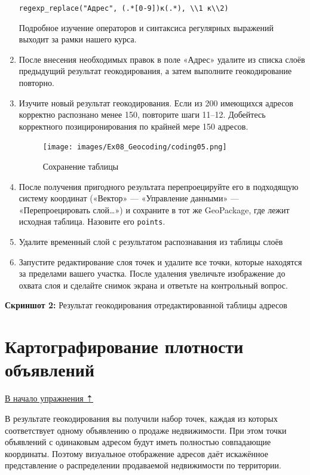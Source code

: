 \documentclass[
  12pt,
]{book}
\begin{document}
\begin{enumerate}
  \texttt{regexp\_replace("Адрес",\ \textquotesingle{}(.*{[}0-9{]})к(.*)\textquotesingle{},\ \textquotesingle{}\textbackslash{}\textbackslash{}1\ к\textbackslash{}\textbackslash{}2\textquotesingle{})}

  Подробное изучение операторов и синтаксиса регулярных выражений выходит за рамки нашего курса.
\item
  После внесения необходимых правок в поле «Адрес» удалите из списка слоёв предыдущий результат геокодирования, а затем выполните геокодирование повторно.
\item
  Изучите новый результат геокодирования. Если из 200 имеющихся адресов корректно распознано менее 150, повторите шаги 11--12. Добейтесь корректного позициронирования по крайней мере 150 адресов.

  \begin{figure}
  \centering
  \texttt{[image: images/Ex08\_Geocoding/coding05.png]}
  \caption{Сохранение таблицы}
  \end{figure}
\item
  После получения пригодного результата перепроецируйте его в подходящую систему координат («Вектор» --- «Управление данными» --- «Перепроецировать слой\ldots») и сохраните в тот же GeoPackage, где лежит исходная таблица. Назовите его \texttt{points}.
\item
  Удалите временный слой с результатом распознавания из таблицы слоёв
\item
  Запустите редактирование слоя точек и удалите все точки, которые находятся за пределами вашего участка. После удаления увеличьте изображение до охвата слоя и сделайте снимок экрана и ответьте на контрольный вопрос.
\end{enumerate}

\textbf{Скриншот 2:} Результат геокодирования отредактированной таблицы адресов

\hypertarget{geocoding-mapping}{%
\section{Картографирование плотности объявлений}\label{geocoding-mapping}}

\protect\hyperlink{geocoding}{В начало упражнения ⇡}

В результате геокодирования вы получили набор точек, каждая из которых соответствует одному объявлению о продаже недвижимости. При этом точки объявлений с одинаковым адресом будут иметь полностью совпадающие координаты. Поэтому визуальное отображение адресов даёт искажённое представление о распределении продаваемой недвижимости по территории.
\end{document}
